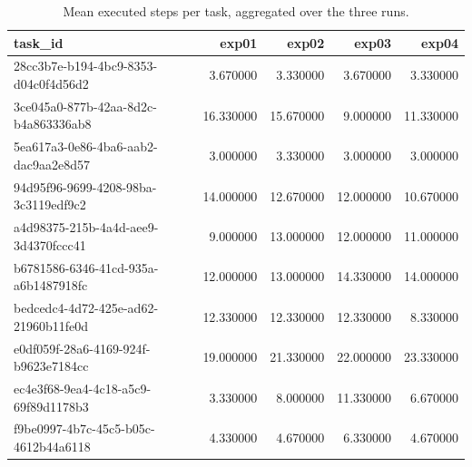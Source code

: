 \begin{table}
\caption{Mean executed steps per task, aggregated over the three runs.}
\label{tab:task_steps_by_exp}
\begin{tabular}{lrrrr}
\toprule
task\_id & exp01 & exp02 & exp03 & exp04 \\
\midrule
28cc3b7e-b194-4bc9-8353-d04c0f4d56d2 & 3.670000 & 3.330000 & 3.670000 & 3.330000 \\
3ce045a0-877b-42aa-8d2c-b4a863336ab8 & 16.330000 & 15.670000 & 9.000000 & 11.330000 \\
5ea617a3-0e86-4ba6-aab2-dac9aa2e8d57 & 3.000000 & 3.330000 & 3.000000 & 3.000000 \\
94d95f96-9699-4208-98ba-3c3119edf9c2 & 14.000000 & 12.670000 & 12.000000 & 10.670000 \\
a4d98375-215b-4a4d-aee9-3d4370fccc41 & 9.000000 & 13.000000 & 12.000000 & 11.000000 \\
b6781586-6346-41cd-935a-a6b1487918fc & 12.000000 & 13.000000 & 14.330000 & 14.000000 \\
bedcedc4-4d72-425e-ad62-21960b11fe0d & 12.330000 & 12.330000 & 12.330000 & 8.330000 \\
e0df059f-28a6-4169-924f-b9623e7184cc & 19.000000 & 21.330000 & 22.000000 & 23.330000 \\
ec4e3f68-9ea4-4c18-a5c9-69f89d1178b3 & 3.330000 & 8.000000 & 11.330000 & 6.670000 \\
f9be0997-4b7c-45c5-b05c-4612b44a6118 & 4.330000 & 4.670000 & 6.330000 & 4.670000 \\
\bottomrule
\end{tabular}
\end{table}
